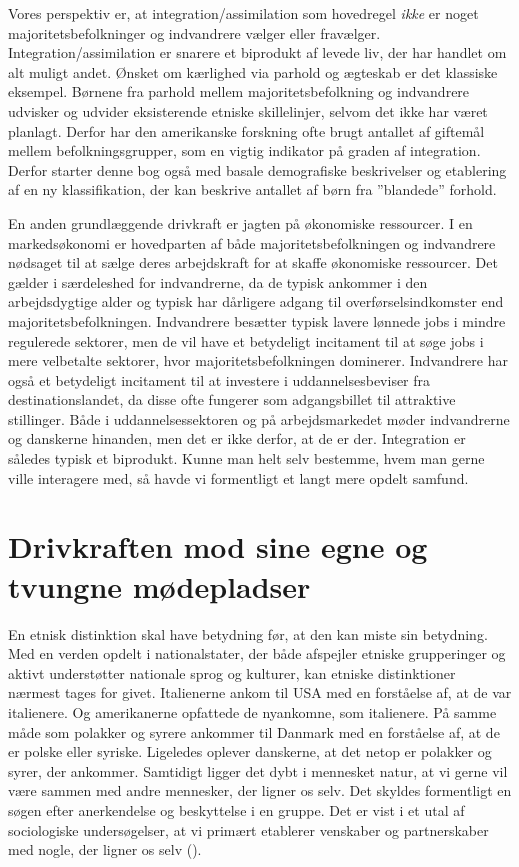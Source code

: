 \documentclass[
]{book}
\begin{document}
Vores perspektiv er, at integration/assimilation som hovedregel \emph{ikke} er noget majoritetsbefolkninger og indvandrere vælger eller fravælger. Integration/assimilation er snarere et biprodukt af levede liv, der har handlet om alt muligt andet. Ønsket om kærlighed via parhold og ægteskab er det klassiske eksempel. Børnene fra parhold mellem majoritetsbefolkning og indvandrere udvisker og udvider eksisterende etniske skillelinjer, selvom det ikke har været planlagt. Derfor har den amerikanske forskning ofte brugt antallet af giftemål mellem befolkningsgrupper, som en vigtig indikator på graden af integration. Derfor starter denne bog også med basale demografiske beskrivelser og etablering af en ny klassifikation, der kan beskrive antallet af børn fra ''blandede'' forhold.

En anden grundlæggende drivkraft er jagten på økonomiske ressourcer. I en markedsøkonomi er hovedparten af både majoritetsbefolkningen og indvandrere nødsaget til at sælge deres arbejdskraft for at skaffe økonomiske ressourcer. Det gælder i særdeleshed for indvandrerne, da de typisk ankommer i den arbejdsdygtige alder og typisk har dårligere adgang til overførselsindkomster end majoritetsbefolkningen. Indvandrere besætter typisk lavere lønnede jobs i mindre regulerede sektorer, men de vil have et betydeligt incitament til at søge jobs i mere velbetalte sektorer, hvor majoritetsbefolkningen dominerer. Indvandrere har også et betydeligt incitament til at investere i uddannelsesbeviser fra destinationslandet, da disse ofte fungerer som adgangsbillet til attraktive stillinger. Både i uddannelsessektoren og på arbejdsmarkedet møder indvandrerne og danskerne hinanden, men det er ikke derfor, at de er der. Integration er således typisk et biprodukt. Kunne man helt selv bestemme, hvem man gerne ville interagere med, så havde vi formentligt et langt mere opdelt samfund.

\section{Drivkraften mod sine egne og tvungne mødepladser}\label{drivkraften-mod-sine-egne-og-tvungne-muxf8depladser}

En etnisk distinktion skal have betydning før, at den kan miste sin betydning. Med en verden opdelt i nationalstater, der både afspejler etniske grupperinger og aktivt understøtter nationale sprog og kulturer, kan etniske distinktioner nærmest tages for givet. Italienerne ankom til USA med en forståelse af, at de var italienere. Og amerikanerne opfattede de nyankomne, som italienere. På samme måde som polakker og syrere ankommer til Danmark med en forståelse af, at de er polske eller syriske. Ligeledes oplever danskerne, at det netop er polakker og syrer, der ankommer. Samtidigt ligger det dybt i mennesket natur, at vi gerne vil være sammen med andre mennesker, der ligner os selv. Det skyldes formentligt en søgen efter anerkendelse og beskyttelse i en gruppe. Det er vist i et utal af sociologiske undersøgelser, at vi primært etablerer venskaber og partnerskaber med nogle, der ligner os selv ().
\end{document}
